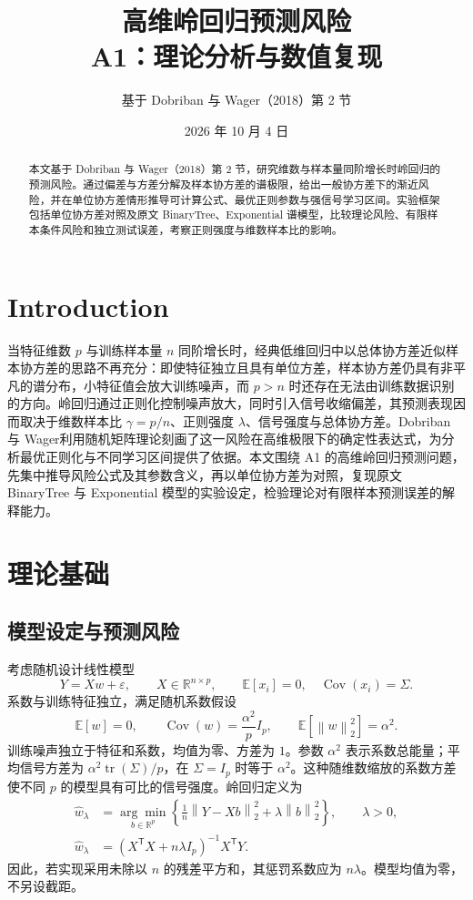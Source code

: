 \documentclass[UTF8,fontset=fandol,a4paper,zihao=-4]{ctexart}
\title{\bfseries 高维岭回归预测风险\\[0.5em]\large A1：理论分析与数值复现}
\author{基于 Dobriban 与 Wager（2018）第 2 节}
\date{2026 年 10 月 4 日}
\DeclareMathOperator{\Cov}{Cov}
\DeclareMathOperator{\tr}{tr}
\newcommand{\E}{\mathbb{E}}
\newcommand{\whw}{\widehat w}
\newcommand{\norm}[1]{\left\lVert #1\right\rVert}
\begin{document}
\maketitle
\thispagestyle{fancy}
\begin{abstract}
本文基于 Dobriban 与 Wager（2018）第 2 节，研究维数与样本量同阶增长时岭回归的预测风险。通过偏差与方差分解及样本协方差的谱极限，给出一般协方差下的渐近风险，并在单位协方差情形推导可计算公式、最优正则参数与强信号学习区间。实验框架包括单位协方差对照及原文 BinaryTree、Exponential 谱模型，比较理论风险、有限样本条件风险和独立测试误差，考察正则强度与维数样本比的影响。
\end{abstract}

\section{Introduction}\label{sec:introduction}
当特征维数 $p$ 与训练样本量 $n$ 同阶增长时，经典低维回归中以总体协方差近似样本协方差的思路不再充分：即使特征独立且具有单位方差，样本协方差仍具有非平凡的谱分布，小特征值会放大训练噪声，而 $p>n$ 时还存在无法由训练数据识别的方向。岭回归通过正则化控制噪声放大，同时引入信号收缩偏差，其预测表现因而取决于维数样本比 $\gamma=p/n$、正则强度 $\lambda$、信号强度与总体协方差。Dobriban 与 Wager\cite{dw}利用随机矩阵理论刻画了这一风险在高维极限下的确定性表达式，为分析最优正则化与不同学习区间提供了依据。本文围绕 A1 的高维岭回归预测问题，先集中推导风险公式及其参数含义，再以单位协方差为对照，复现原文 BinaryTree 与 Exponential 模型的实验设定，检验理论对有限样本预测误差的解释能力。

\section{理论基础}\label{sec:theory}
\subsection{模型设定与预测风险}
考虑随机设计线性模型
\begin{equation}\label{eq:model}
 Y=Xw+\varepsilon,\qquad X\in\mathbb R^{n\times p},\qquad
 \E[x_i]=0,\quad\Cov(x_i)=\Sigma.
\end{equation}
系数与训练特征独立，满足随机系数假设
\begin{equation}\label{eq:rrc}
 \E[w]=0,\qquad\Cov(w)=\frac{\alpha^2}{p}I_p,\qquad
 \E[\norm{w}_2^2]=\alpha^2.
\end{equation}
训练噪声独立于特征和系数，均值为零、方差为 $1$。参数 $\alpha^2$ 表示系数总能量；平均信号方差为 $\alpha^2\tr(\Sigma)/p$，在 $\Sigma=I_p$ 时等于 $\alpha^2$。这种随维数缩放的系数方差使不同 $p$ 的模型具有可比的信号强度。岭回归定义为
\begin{align}
 \whw_\lambda
 &=\underset{b\in\mathbb R^p}{\arg\min}
 \left\{\frac{1}{n}\norm{Y-Xb}_2^2+\lambda\norm{b}_2^2\right\},
 \qquad\lambda>0,\label{eq:objective}\\
 \whw_\lambda&=(X^{\mathsf T}X+n\lambda I_p)^{-1}X^{\mathsf T}Y.
 \label{eq:ridge}
\end{align}
因此，若实现采用未除以 $n$ 的残差平方和，其惩罚系数应为 $n\lambda$。模型均值为零，不另设截距。
\end{document}
